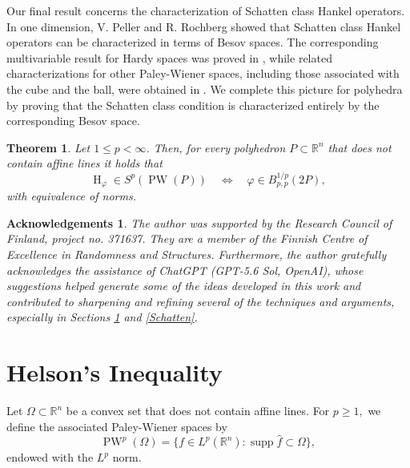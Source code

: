 \documentclass{amsart}
\theoremstyle{plain}
\newtheorem{theo}{Theorem}[section]
\newtheorem*{ack}{Acknowledgements}
\DeclareMathOperator{\Ha}{H}
\DeclareMathOperator{\PW}{PW}
\DeclareMathOperator{\supp}{supp}
\begin{document}
Our final result concerns the characterization of Schatten class Hankel operators. In one dimension, V. Peller and R. Rochberg \cite{MR878246,Peller1988WienerHopf} showed that Schatten class Hankel operators can be characterized in terms of Besov spaces. The corresponding multivariable result for Hardy spaces was proved in \cite{PottSmith2004}, while related characterizations for other Paley-Wiener spaces, including those associated with the cube and the ball, were obtained in \cite{bampouras2024besovspacesschattenclass,Peng1989PaleyWiener,Peng1988Disk}. We complete this picture for polyhedra by proving that the Schatten class condition is characterized entirely by the corresponding Besov space.

\begin{theo} Let $1\leq p<\infty$. Then, for every polyhedron $P\subset \mathbb{R}^n$ that does not contain affine lines it holds that
	$$\Ha_\varphi\in S^p(\PW(P))
	\quad\Longleftrightarrow\quad
	\varphi\in B_{p,p}^{1/p}(2P),$$
	with equivalence of norms.
\end{theo}

	
	\begin{ack}
		The author was supported by the Research Council of Finland, project no. 371637. They are a member of the Finnish Centre of Excellence in Randomness and Structures. Furthermore, the author gratefully acknowledges the assistance of ChatGPT (GPT-5.6 Sol, OpenAI), whose suggestions helped generate some of the ideas developed in this work and contributed to sharpening and refining several of the techniques and arguments, especially in Sections \ref{sec2} and \ref{Schatten}.
		
		
	\end{ack}

\section{Helson's Inequality}\label{sec2}
Let $\Omega\subset \mathbb{R}^n$ be a convex set that does not contain affine lines. For $p\geq 1,$ we define the associated Paley-Wiener spaces by
$$\PW^p(\Omega)=\{f\in L^p(\mathbb{R}^n):\supp\hat{f}\subset \Omega\},$$ endowed with the $L^p$ norm.
\end{document}
